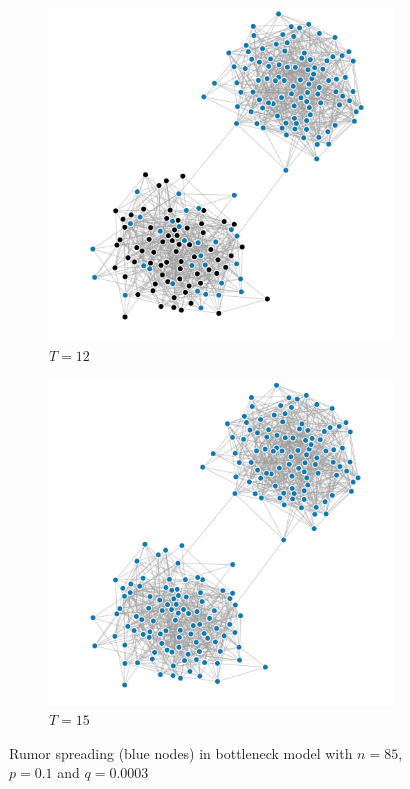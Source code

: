 \documentclass[10pt,journal,a4paper]{IEEEtran}
\begin{document}
\begin{figure}
\begin{subfigure}[b]{.5\linewidth}
\includegraphics[width=1\linewidth]{figs/split-3}
\caption{$T=12$}
\end{subfigure}%
\begin{subfigure}[b]{.5\linewidth}
\includegraphics[width=1\linewidth]{figs/split-4}
\caption{$T=15$}
\end{subfigure}

\caption{Rumor spreading (blue nodes) in bottleneck model with $n=85$, $p = 0.1$ and $q = 0.0003$}
\label{barabasi-albert-graphs}
\end{figure}
\end{document}
